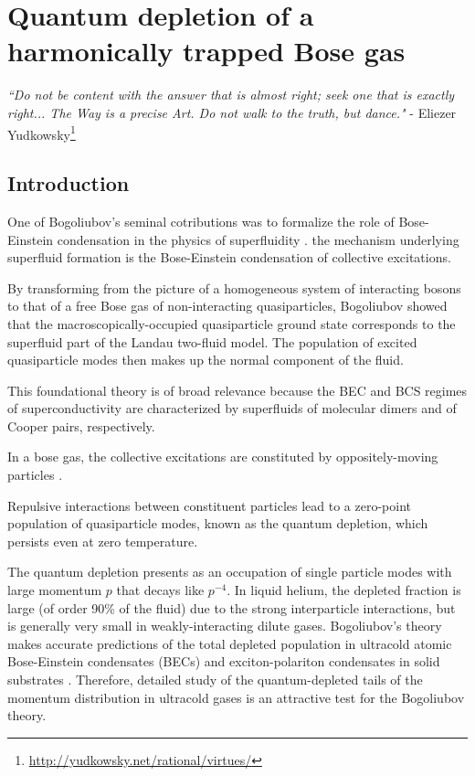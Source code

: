 \chapter{Quantum depletion of a harmonically trapped Bose gas}
\label{chap:QD}

\begin{adjustwidth}{3cm}{0cm}
\begin{flushright}
\emph{``Do not be content with the answer that is almost right; seek one that is exactly right...
	The Way is a precise Art.
	Do not walk to the truth, but dance."} - Eliezer Yudkowsky\footnote{\url{http://yudkowsky.net/rational/virtues/}}
\end{flushright}
\end{adjustwidth}


\section{Introduction} 
	One of Bogoliubov's seminal cotributions was to formalize the role of Bose-Einstein condensation in the physics of superfluidity \cite{Bogolubov47}.
	the mechanism underlying superfluid formation is the Bose-Einstein condensation of collective excitations.
	
	By transforming from the picture of a homogeneous system of interacting bosons to that of a free Bose gas of non-interacting quasiparticles, Bogoliubov showed that the macroscopically-occupied quasiparticle ground state corresponds to the superfluid part of the Landau two-fluid model.
	The population of excited quasiparticle modes then makes up the normal component of the fluid.
	
	This foundational theory is of broad relevance because the BEC and BCS regimes of superconductivity are characterized by superfluids of molecular dimers and of Cooper pairs, respectively.
	  

	In a bose gas, the collective excitations are constituted by oppositely-moving particles \cite{Vogels02}.
	
	Repulsive interactions between constituent particles lead to a zero-point population of quasiparticle modes, known as the quantum depletion, which persists even at zero temperature.
	
	The quantum depletion presents as an occupation of single particle modes with large momentum $p$ that decays like $p^{-4}$.
	In liquid helium, the depleted fraction is large (of order 90\% of the fluid) due to the strong interparticle interactions, but is generally very small in weakly-interacting dilute gases.
	Bogoliubov's theory makes accurate predictions of the total depleted population in ultracold atomic Bose-Einstein condensates (BECs) \cite{xu06,lopes17_depletion} and exciton-polariton condensates in solid substrates \cite{pieczarka20}.
	Therefore, detailed study of the quantum-depleted tails of the momentum distribution in ultracold gases is an attractive test for the Bogoliubov theory.

